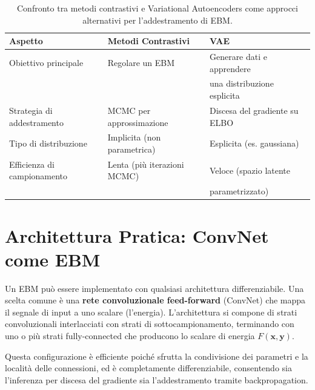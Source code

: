 \begin{table}[H]
  \centering
  \caption{Confronto tra metodi contrastivi e Variational Autoencoders
           come approcci alternativi per l'addestramento di EBM.}
  \label{tab:cd-vs-vae}
  \small
  \begin{tabular}{lll}
    \toprule
    \textbf{Aspetto}            & \textbf{Metodi Contrastivi}         & \textbf{VAE}                        \\
    \midrule
    Obiettivo principale        & Regolare un EBM                     & Generare dati e apprendere          \\
                                &                                     & una distribuzione esplicita         \\
    Strategia di addestramento  & MCMC per approssimazione            & Discesa del gradiente su ELBO       \\
    Tipo di distribuzione       & Implicita (non parametrica)         & Esplicita (es. gaussiana)           \\
    Efficienza di campionamento & Lenta (più iterazioni MCMC)         & Veloce (spazio latente              \\
                                &                                     & parametrizzato)                     \\
    \bottomrule
  \end{tabular}
\end{table}

\section{Architettura Pratica: ConvNet come EBM}
\label{sec:ebm-convnet}

Un EBM può essere implementato con qualsiasi architettura differenziabile.
Una scelta comune è una \textbf{rete convoluzionale feed-forward} (ConvNet)
che mappa il segnale di input a uno scalare (l'energia). L'architettura
si compone di strati convoluzionali interlacciati con strati di
sottocampionamento, terminando con uno o più strati fully-connected che
producono lo scalare di energia $F(\mathbf{x}, \mathbf{y})$.

Questa configurazione è efficiente poiché sfrutta la condivisione dei
parametri e la località delle connessioni, ed è completamente
differenziabile, consentendo sia l'inferenza per discesa del gradiente
sia l'addestramento tramite backpropagation.
